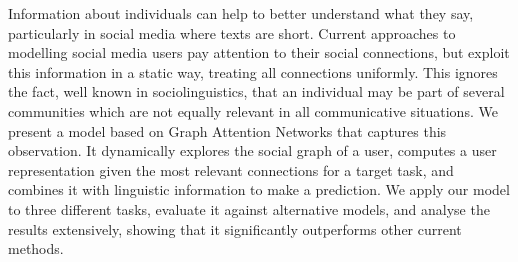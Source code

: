Information about individuals can help to better understand what they say, particularly in social media where texts are short. Current approaches to modelling social media users pay attention to their social connections, but exploit this information in a static way, treating all connections uniformly. This ignores the fact, well known in sociolinguistics, that an individual may be part of several communities which are not equally relevant in all communicative situations. We present a model based on Graph Attention Networks that captures this observation. It dynamically explores the social graph of a user, computes a user representation given the most relevant connections for a target task, and combines it with linguistic information to make a prediction. 
We apply our model to three different tasks, evaluate it against alternative models, and analyse the results extensively, showing that it significantly outperforms other current methods.